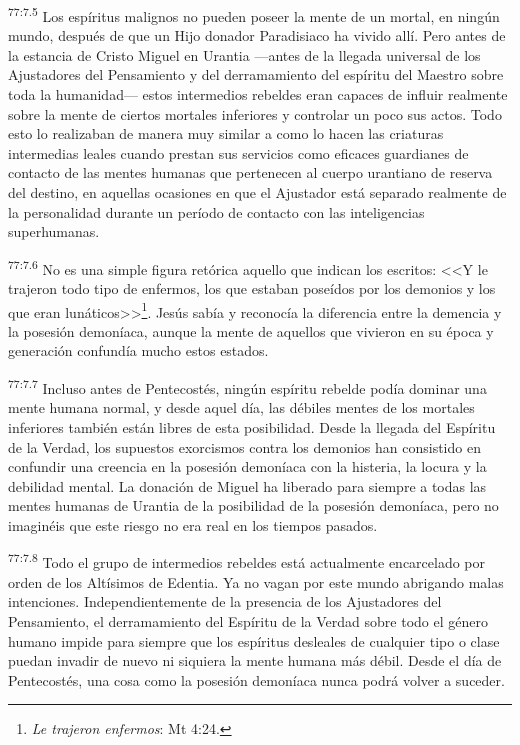 \par
\textsuperscript{77:7.5} Los espíritus malignos no pueden poseer la mente de un mortal, en ningún mundo, después de que un Hijo donador Paradisiaco ha vivido allí. Pero antes de la estancia de Cristo Miguel en Urantia ---antes de la llegada universal de los Ajustadores del Pensamiento y del derramamiento del espíritu del Maestro sobre toda la humanidad--- estos intermedios rebeldes eran capaces de influir realmente sobre la mente de ciertos mortales inferiores y controlar un poco sus actos. Todo esto lo realizaban de manera muy similar a como lo hacen las criaturas intermedias leales cuando prestan sus servicios como eficaces guardianes de contacto de las mentes humanas que pertenecen al cuerpo urantiano de reserva del destino, en aquellas ocasiones en que el Ajustador está separado realmente de la personalidad durante un período de contacto con las inteligencias superhumanas.

\par
\textsuperscript{77:7.6} No es una simple figura retórica aquello que indican los escritos: <<Y le trajeron todo tipo de enfermos, los que estaban poseídos por los demonios y los que eran lunáticos>>\footnote{\textit{Le trajeron enfermos}: Mt 4:24.}. Jesús sabía y reconocía la diferencia entre la demencia y la posesión demoníaca, aunque la mente de aquellos que vivieron en su época y generación confundía mucho estos estados.

\par
\textsuperscript{77:7.7} Incluso antes de Pentecostés, ningún espíritu rebelde podía dominar una mente humana normal, y desde aquel día, las débiles mentes de los mortales inferiores también están libres de esta posibilidad. Desde la llegada del Espíritu de la Verdad, los supuestos exorcismos contra los demonios han consistido en confundir una creencia en la posesión demoníaca con la histeria, la locura y la debilidad mental. La donación de Miguel ha liberado para siempre a todas las mentes humanas de Urantia de la posibilidad de la posesión demoníaca, pero no imaginéis que este riesgo no era real en los tiempos pasados.

\par
\textsuperscript{77:7.8} Todo el grupo de intermedios rebeldes está actualmente encarcelado por orden de los Altísimos de Edentia. Ya no vagan por este mundo abrigando malas intenciones. Independientemente de la presencia de los Ajustadores del Pensamiento, el derramamiento del Espíritu de la Verdad sobre todo el género humano impide para siempre que los espíritus desleales de cualquier tipo o clase puedan invadir de nuevo ni siquiera la mente humana más débil. Desde el día de Pentecostés, una cosa como la posesión demoníaca nunca podrá volver a suceder.

